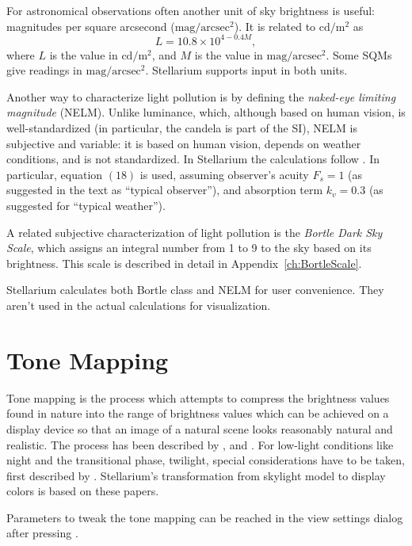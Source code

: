 For astronomical observations often another unit of sky brightness is useful: magnitudes per square arcsecond ($\mathrm{mag/arcsec^2}$). It is related to $\mathrm{cd/m^2}$ as
\begin{equation}
L=10.8\times10^{4-0.4M},
\end{equation}
where $L$ is the value in $\mathrm{cd/m^2}$, and $M$ is the value in $\mathrm{mag/arcsec^2}$. Some SQMs give readings in $\mathrm{mag/arcsec^2}$. Stellarium supports input in both units.

Another way to characterize light pollution is by defining the \emph{naked-eye limiting magnitude} (NELM). Unlike luminance, which, although based on human vision, is well-standardized (in particular, the candela is part of the SI), NELM is subjective and variable: it is based on human vision, depends on weather conditions, and is not standardized. In Stellarium the calculations follow \citet{Schaefer:LimitingMagnitudes}. In particular, equation $(18)$ is used, assuming observer's acuity $F_s=1$ (as suggested in the text as ``typical observer''), and absorption term $k_v=0.3$ (as suggested for ``typical weather'').

A related subjective characterization of light pollution is the \emph{Bortle Dark Sky Scale}, which assigns an integral number from 1 to 9 to the sky based on its brightness. This scale is described in detail in Appendix~\ref{ch:BortleScale}.

Stellarium calculates both Bortle class and NELM for user convenience. They aren't used in the actual calculations for visualization.

\section{Tone Mapping}

Tone mapping is the process which attempts to compress the brightness
values found in nature into the range of brightness values which can
be achieved on a display device so that an image of a natural scene looks reasonably natural
and realistic. The process has been described by
\citet{TumblinRushmeier:1993}, \citet{Larson:1997} and
\citet{DevlinChalmersWilkie:2002}. For low-light conditions like night
and the transitional phase, twilight, special considerations have to
be taken, first described by \citet{WannJensen:2000}.
Stellarium's transformation from skylight model to display colors is based on these papers.

Parameters to tweak the tone mapping can be reached in the view
settings dialog after pressing .

